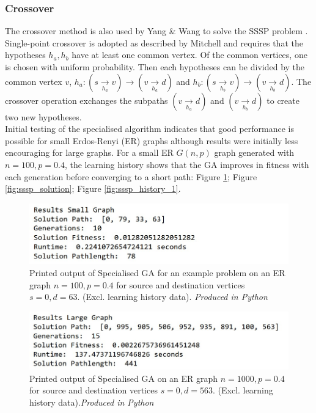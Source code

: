 \documentclass[
	a4paper, %
	10pt, %
	unnumberedsections, %
	twoside, %
]{LTJournalArticle}
\begin{document}
\subsubsection{Crossover} The crossover method is also used by Yang \& Wang to solve the SSSP problem \cite{yang:10}. Single-point crossover is adopted as described by Mitchell \cite{mitchell:97} and requires that the hypotheses \(h_{a}, h_{b}\) have at least one common vertex. Of the common vertices, one is chosen with uniform probability. Then each hypotheses can be divided by the common vertex \(v\),  \(h_{a}: (s \xrightarrow[h_{a}]{} v) \rightarrow (v \xrightarrow[h_{a}]{} d)\) and \(h_{b}: (s \xrightarrow[h_{b}]{} v) \rightarrow (v \xrightarrow[h_{b}]{} d)\). The crossover operation exchanges the subpaths \((v \xrightarrow[h_{a}]{} d)\) and \((v \xrightarrow[h_{b}]{} d)\) to create two new hypotheses. \\

Initial testing of the specialised algorithm indicates that good performance is possible for small Erdos-Renyi (ER) graphs although results were initially less encouraging for large graphs. For a small ER \(G(n, p)\) graph generated with \(n = 100, p = 0.4\), the learning history shows that the GA improves in fitness with each generation before converging to a short path: Figure \ref{fig:sssp_result_small_1}; Figure \ref{fig:sssp_solution}; Figure \ref{fig:sssp_history_1}. 


\begin{figure}[H]
	\includegraphics[width=\linewidth]{Figures/sssp/result_small.jpg}
	\caption{Printed output of Specialised GA for an example problem on an ER graph \(n = 100, p = 0.4\) for source and destination vertices \(s = 0, d = 63\). (Excl. learning history data).  \emph{Produced in Python}}
	\label{fig:sssp_result_small_1}
\end{figure}

\begin{figure}[H]
	\includegraphics[width=\linewidth]{Figures/sssp/result_large.jpg}
	\caption{Printed output of Specialised GA on an ER graph \(n = 1000, p = 0.4\) for source and destination vertices \(s = 0, d = 563\). (Excl. learning history data).\emph{Produced in Python}}
	\label{fig:sssp_result_large}
\end{figure}
\end{document}
